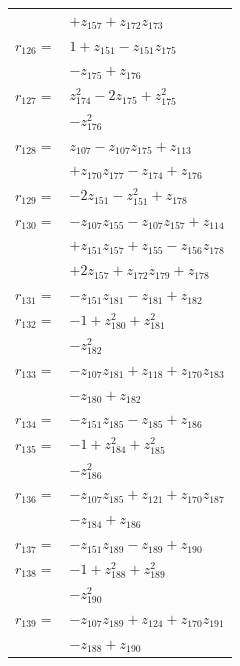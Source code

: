 \begin{longtable}{@{}r@{\;}l@{}}
 & \(\displaystyle +z_{157} +z_{172}z_{173}\) \\[3pt]
\(r_{126}=\) & \(\displaystyle 1 +z_{151} -z_{151}z_{175}\) \\
 & \(\displaystyle -z_{175} +z_{176}\) \\[3pt]
\(r_{127}=\) & \(\displaystyle z_{174}^{2} -2z_{175} +z_{175}^{2}\) \\
 & \(\displaystyle -z_{176}^{2}\) \\[3pt]
\(r_{128}=\) & \(\displaystyle z_{107} -z_{107}z_{175} +z_{113}\) \\
 & \(\displaystyle +z_{170}z_{177} -z_{174} +z_{176}\) \\[3pt]
\(r_{129}=\) & \(\displaystyle -2z_{151} -z_{151}^{2} +z_{178}\) \\[3pt]
\(r_{130}=\) & \(\displaystyle -z_{107}z_{155} -z_{107}z_{157} +z_{114}\) \\
 & \(\displaystyle +z_{151}z_{157} +z_{155} -z_{156}z_{178}\) \\
 & \(\displaystyle +2z_{157} +z_{172}z_{179} +z_{178}\) \\[3pt]
\(r_{131}=\) & \(\displaystyle -z_{151}z_{181} -z_{181} +z_{182}\) \\[3pt]
\(r_{132}=\) & \(\displaystyle -1 +z_{180}^{2} +z_{181}^{2}\) \\
 & \(\displaystyle -z_{182}^{2}\) \\[3pt]
\(r_{133}=\) & \(\displaystyle -z_{107}z_{181} +z_{118} +z_{170}z_{183}\) \\
 & \(\displaystyle -z_{180} +z_{182}\) \\[3pt]
\(r_{134}=\) & \(\displaystyle -z_{151}z_{185} -z_{185} +z_{186}\) \\[3pt]
\(r_{135}=\) & \(\displaystyle -1 +z_{184}^{2} +z_{185}^{2}\) \\
 & \(\displaystyle -z_{186}^{2}\) \\[3pt]
\(r_{136}=\) & \(\displaystyle -z_{107}z_{185} +z_{121} +z_{170}z_{187}\) \\
 & \(\displaystyle -z_{184} +z_{186}\) \\[3pt]
\(r_{137}=\) & \(\displaystyle -z_{151}z_{189} -z_{189} +z_{190}\) \\[3pt]
\(r_{138}=\) & \(\displaystyle -1 +z_{188}^{2} +z_{189}^{2}\) \\
 & \(\displaystyle -z_{190}^{2}\) \\[3pt]
\(r_{139}=\) & \(\displaystyle -z_{107}z_{189} +z_{124} +z_{170}z_{191}\) \\
 & \(\displaystyle -z_{188} +z_{190}\) \\[3pt]

\end{longtable}

